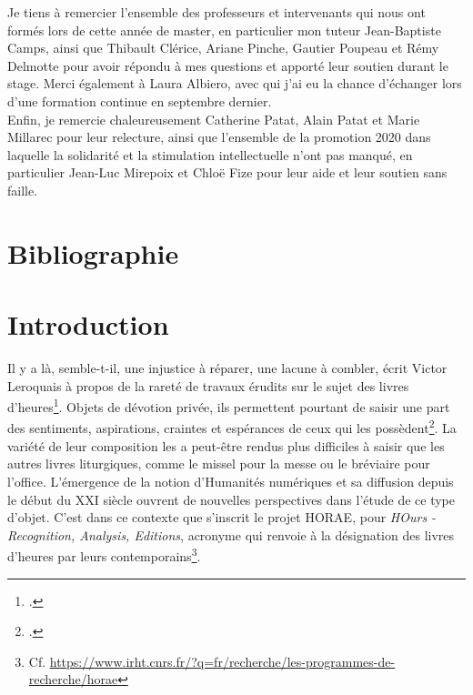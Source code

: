\documentclass[a4paper,12pt,twoside]{book}
\begin{document}
	Je tiens à remercier l'ensemble des professeurs et intervenants qui nous ont formés lors de cette année de master, en particulier mon tuteur Jean-Baptiste Camps, ainsi que Thibault Clérice, Ariane Pinche, Gautier Poupeau et Rémy Delmotte pour avoir répondu à mes questions et apporté leur soutien durant le stage. Merci également à Laura Albiero, avec qui j'ai eu la chance d'échanger lors d'une formation continue en septembre dernier.\\
	
	Enfin, je remercie chaleureusement Catherine Patat, Alain Patat et Marie Millarec pour leur relecture, ainsi que l'ensemble de la promotion 2020 dans laquelle la solidarité et la stimulation intellectuelle n'ont pas manqué, en particulier Jean-Luc Mirepoix et Chloë Fize pour leur aide et leur soutien sans faille. 

    \newpage
	\chapter*{Bibliographie}
	    \printbibliography[heading=subbibliography,keyword={MA},title={Manuscrits, livres d'heures, liturgie et dévotion au Moyen Âge}]	
	    \newpage
	     \printbibliography[heading=subbibliography,keyword={HN},title={Réflexions autour des Humanités numériques}]
	     \newpage
	     \printbibliography[heading=subbibliography,keyword={technologies},title={Normes, méthodes et pratiques numériques}]	
	
	
	\chapter*{Introduction}

	\og Il y a là, semble-t-il, une injustice à réparer, une lacune à combler\fg{}, écrit Victor Leroquais à propos de la rareté de travaux érudits sur le sujet des livres d'heures\footcite[p. II]{Leroquais_notices}. Objets de dévotion privée, ils permettent pourtant de saisir une part des sentiments, aspirations, craintes et espérances de ceux qui les possèdent\footcite[p. II]{Leroquais_notices}. La variété de leur composition les a peut-être rendus plus difficiles à saisir que les autres livres liturgiques, comme le missel pour la messe ou le bréviaire pour l'office. L'émergence de la notion d'\og Humanités numériques \fg{} et sa diffusion depuis le début du \textsc{XXI} siècle ouvrent de nouvelles perspectives dans l'étude de ce type d'objet. C'est dans ce contexte que s'inscrit le projet HORAE, pour \textit{HOurs - Recognition, Analysis, Editions}, acronyme qui renvoie à la désignation des livres d'heures par leurs contemporains\footnote{Cf. \url{https://www.irht.cnrs.fr/?q=fr/recherche/les-programmes-de-recherche/horae}}. \\
	
\end{document}
